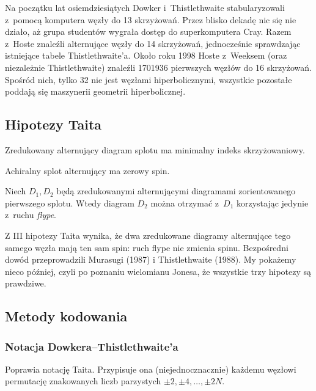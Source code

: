 {Na początku lat osiemdziesiątych Dowker i~Thistlethwaite stabularyzowali z~pomocą komputera węzły do 13 skrzyżowań.
Przez blisko dekadę nic się nie działo, aż grupa studentów wygrała dostęp do superkomputera Cray.
Razem z~Hoste znaleźli alternujące węzły do 14 skrzyżowań, jednocześnie sprawdzając istniejące tabele Thistlethwaite'a.
Około roku 1998 Hoste z~Weeksem (oraz niezależnie Thistlethwaite) znaleźli 1701936 pierwszych węzłów do 16 skrzyżowań.
Spośród nich, tylko 32 nie jest węzłami hiperbolicznymi, wszystkie pozostałe poddają się maszynerii geometrii hiperbolicznej.

\subsection{Hipotezy Taita}
\begin{conjecture}
    \label{conj_tait_i}
    Zredukowany alternujący diagram splotu ma minimalny indeks skrzyżowaniowy.
\end{conjecture}

\begin{conjecture}
    \label{conj_tait_ii}
    Achiralny splot alternujący ma zerowy spin.
\end{conjecture}

\begin{conjecture}
    \label{conj_tait_iii}
    Niech $D_1, D_2$ będą zredukowanymi alternującymi diagramami zorientowanego pierwszego splotu.
    Wtedy diagram $D_2$ można otrzymać z~$D_1$ korzystając jedynie z~ruchu \emph{flype}.
\end{conjecture}

Z III hipotezy Taita wynika, że dwa zredukowane diagramy alternujące tego samego węzła mają ten sam spin: ruch flype nie zmienia spinu.
Bezpośredni dowód przeprowadzili Murasugi (1987) i Thistlethwaite (1988).
My pokażemy nieco później, czyli po poznaniu wielomianu Jonesa, że wszystkie trzy hipotezy są prawdziwe.

\subsection{Metody kodowania}
\subsubsection{Notacja Dowkera--Thistlethwaite'a}
Poprawia notację Taita.
Przypisuje ona (niejednocznacznie) każdemu węzłowi permutację znakowanych liczb parzystych $\pm 2, \pm 4, \ldots, \pm 2N$.

}
